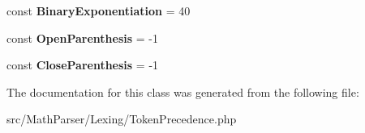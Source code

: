 \begin{DoxyCompactItemize}
\item 
\hypertarget{classMathParser_1_1Lexing_1_1TokenPrecedence_ac3726ec81f726ab641bac8c207c82d70}{const {\bfseries Binary\-Exponentiation} = 40}\label{classMathParser_1_1Lexing_1_1TokenPrecedence_ac3726ec81f726ab641bac8c207c82d70}

\item 
\hypertarget{classMathParser_1_1Lexing_1_1TokenPrecedence_a23ad66e41ed25314ffc29d5eebe29d60}{const {\bfseries Open\-Parenthesis} = -\/1}\label{classMathParser_1_1Lexing_1_1TokenPrecedence_a23ad66e41ed25314ffc29d5eebe29d60}

\item 
\hypertarget{classMathParser_1_1Lexing_1_1TokenPrecedence_a061d70719b5bb47c018fd6841832b34f}{const {\bfseries Close\-Parenthesis} = -\/1}\label{classMathParser_1_1Lexing_1_1TokenPrecedence_a061d70719b5bb47c018fd6841832b34f}

\end{DoxyCompactItemize}


The documentation for this class was generated from the following file\-:\begin{DoxyCompactItemize}
\item 
src/\-Math\-Parser/\-Lexing/Token\-Precedence.\-php\end{DoxyCompactItemize}
